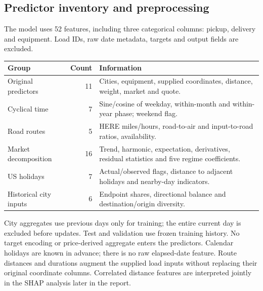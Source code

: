 \documentclass[10pt,a4paper]{article}
\begin{document}
\subsection*{Predictor inventory and preprocessing}
The model uses 52 features, including three categorical columns: pickup, delivery and equipment. Load IDs, raw date metadata, targets and output fields are excluded.
\par\noindent\begin{tabularx}{\linewidth}{lrY}
\toprule Group & Count & Information \\
\midrule Original predictors & 11 & Cities, equipment, supplied coordinates, distance, weight, market and quote. \\
Cyclical time & 7 & Sine/cosine of weekday, within-month and within-year phase; weekend flag. \\
Road routes & 5 & HERE miles/hours, road-to-air and input-to-road ratios, availability. \\
Market decomposition & 16 & Trend, harmonic, expectation, derivatives, residual statistics and five regime coefficients. \\
US holidays & 7 & Actual/observed flags, distance to adjacent holidays and nearby-day indicators. \\
Historical city inputs & 6 & Endpoint shares, directional balance and destination/origin diversity. \\
\bottomrule
\end{tabularx}\par
City aggregates use previous days only for training; the entire current day is excluded before updates. Test and validation use frozen training history. No target encoding or price-derived aggregate enters the predictors. Calendar holidays are known in advance; there is no raw elapsed-date feature.
Route distances and durations augment the supplied load inputs without replacing their original coordinate columns. Correlated distance features are interpreted jointly in the SHAP analysis later in the report.

\newpage
\end{document}
